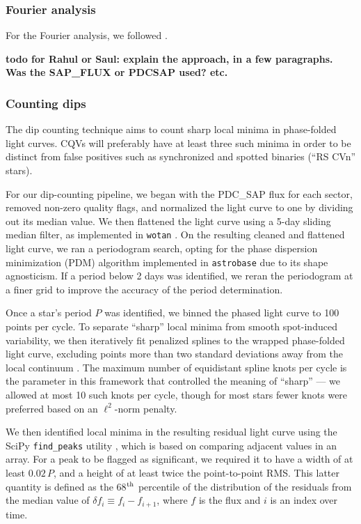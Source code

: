 \documentclass[11pt,twocolumn,tighten]{aastex63}
\begin{document}
\subsubsection{Fourier analysis}
\label{subsec:fourier}
For the Fourier analysis, we followed \citet{2019ApJ...876..127Z}.

{\bf todo for Rahul or Saul: explain the approach, in a few
paragraphs.  Was the SAP\_FLUX or PDCSAP used? etc. }


\subsubsection{Counting dips}
\label{subsec:counting}

The dip counting technique aims to count sharp local minima in
phase-folded light curves.  CQVs will preferably have at least three
such minima in order to be distinct from false positives such as
synchronized and spotted binaries (``RS CVn'' stars). 

For our dip-counting pipeline, we began with the PDC\_SAP flux for
each sector, removed non-zero quality flags, and normalized the light
curve to one by dividing out its median value.  We then flattened the
light curve using a 5-day sliding median filter, as implemented in
\texttt{wotan} \citep{2019AJ....158..143H}.  On the resulting cleaned
and flattened light curve, we ran a periodogram search, opting for the
\citet{1978ApJ...224..953S} phase dispersion minimization (PDM)
algorithm implemented in \texttt{astrobase}
\citep{2021zndo...1011188B} due to its shape agnosticism.  If a period
below 2 days was identified, we reran the periodogram at a finer grid
to improve the accuracy of the period determination.

Once a star's period $P$ was identified, we binned the phased light
curve to 100 points per cycle.  To separate ``sharp'' local minima
from smooth spot-induced variability, we then iteratively fit
penalized splines to the wrapped phase-folded light curve, excluding
points more than two standard deviations away from the local continuum
\citep{2019AJ....158..143H}.  The maximum number of equidistant spline
knots per cycle is the parameter in this framework that controlled the
meaning of ``sharp'' --- we allowed at most 10 such knots per cycle,
though for most stars fewer knots were preferred based on an
$\ell^2$-norm penalty. 

We then identified local minima in the resulting residual light curve
using the SciPy \texttt{find\_peaks} utility
\citep{2020NatMe..17..261V}, which is based on comparing adjacent
values in an array.  For a peak to be flagged as significant, we
required it to have a width of at least $0.02\,P$, and a height of at
least twice the point-to-point RMS.  This latter quantity is defined
as the 68$^{\rm th}$ percentile of the distribution of the residuals
from the median value of $\delta f_i \equiv f_i - f_{i+1}$, where $f$
is the flux and $i$ is an index over time.
\end{document}
